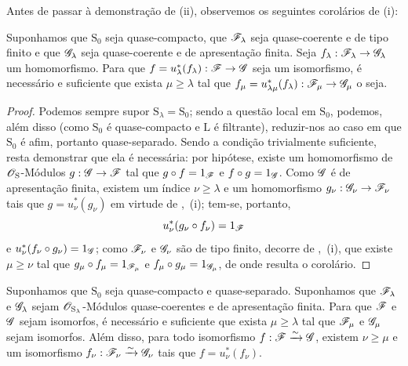 Antes de passar à demonstração de (ii), observemos os seguintes corolários de (i):

\begin{corollary}[8.5.2.4]
\label{IV.8.5.2.4}
Suponhamos que $\mathrm{S}_0$ seja quase-compacto, que $\mathscr{F}_\lambda$ seja quase-coerente e de tipo finito e que $\mathscr{G}_\lambda$ seja quase-coerente e de apresentação finita.
Seja $f_\lambda:\sh{F}_\lambda\to\sh{G}_\lambda$ um homomorfismo.
Para que $f=u_\lambda^*(f_\lambda):\sh{F}\to\sh{G}$ seja um isomorfismo, é necessário e suficiente que exista $\mu\geqslant\lambda$ tal que $f_\mu=u_{\lambda\mu}^*(f_\lambda):\sh{F}_\mu\to\sh{G}_\mu$ o seja.
\end{corollary}

\begin{proof}
Podemos sempre supor $\mathrm{S}_\lambda=\mathrm{S}_0$; sendo a questão local em $\mathrm{S}_0$, podemos, além disso (como $\mathrm{S}_0$ é quase-compacto e $\mathrm{L}$ é filtrante), reduzir-nos ao caso em que $\mathrm{S}_0$ é afim, portanto quase-separado.
Sendo a condição trivialmente suficiente, resta demonstrar que ela é necessária: por hipótese, existe um homomorfismo de $\mathscr{O}_\mathrm{S}$-Módulos $g:\sh{G}\to\sh{F}$ tal que $g\circ f=1_\mathscr{F}$ e $f\circ g=1_\mathscr{G}$.
Como $\mathscr{G}$ é de apresentação finita, existem um índice $\nu\geqslant\lambda$ e um homomorfismo $g_\nu:\sh{G}_\nu\to\sh{F}_\nu$ tais que $g=u_\nu^*(g_\nu)$ em virtude de ,~(i); tem-se, portanto,
\[
  u_\nu^*(g_\nu\circ f_\nu)=1_\mathscr{F}
\]
e $u_\nu^*(f_\nu\circ g_\nu)=1_\mathscr{G}$; como $\mathscr{F}_\nu$ e $\mathscr{G}_\nu$ são de tipo finito, decorre de ,~(i), que existe $\mu\geqslant\nu$ tal que $g_\mu\circ f_\mu=1_{\mathscr{F}_\mu}$ e $f_\mu\circ g_\mu=1_{\mathscr{G}_\mu}$, de onde resulta o corolário.
\end{proof}

\begin{corollary}[8.5.2.5]
\label{IV.8.5.2.5}
Suponhamos que $\mathrm{S}_0$ seja quase-compacto e quase-separado.
Suponhamos que $\mathscr{F}_\lambda$ e $\mathscr{G}_\lambda$ sejam $\mathscr{O}_{\mathrm{S}_\lambda}$-Módulos quase-coerentes e de apresentação finita.
Para que $\mathscr{F}$ e $\mathscr{G}$ sejam isomorfos, é necessário e suficiente que exista $\mu\geqslant\lambda$ tal que $\mathscr{F}_\mu$ e $\mathscr{G}_\mu$ sejam isomorfos.
Além disso, para todo isomorfismo $f:\mathscr{F}\xrightarrow{\sim}\mathscr{G}$, existem $\nu\geqslant\mu$ e um isomorfismo $f_\nu:\mathscr{F}_\nu\xrightarrow{\sim}\mathscr{G}_\nu$ tais que $f=u_\nu^*(f_\nu)$.
\end{corollary}

